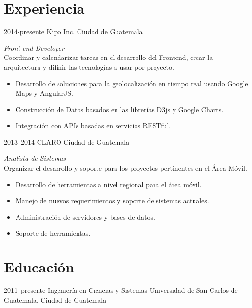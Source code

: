 \documentclass[]{friggeri-cv} %
\begin{document}
\section{Experiencia}
\begin{entrylist}
\entry
	{2014-presente}
	{Kipo Inc.}
	{Ciudad de Guatemala}
	{\emph{Front-end Developer} \\
	Coordinar y calendarizar tareas en el desarrollo del Frontend, crear la arquitectura y difinir las tecnologías a usar por proyecto.
	\begin{itemize}
		\item Desarrollo de soluciones para la geolocalización en tiempo real usando Google Maps y AngularJS.
		\item Construcción de Datos basados en las librerías D3js y Google Charts.
		\item Integración con APIs basadas en servicios RESTful.
	\end{itemize}
	
	}
	
\entry
	{2013--2014}
	{CLARO}
	{Ciudad de Guatemala}
	{\emph{Analista de Sistemas} \\
	Organizar el desarrollo y soporte para los proyectos pertinentes en el Área Móvil.
	\begin{itemize}
		\item Desarrollo de herramientas a nivel regional para el área móvil. 
		\item Manejo de nuevos requerimientos y soporte de sistemas actuales.
		\item Administración de servidores y bases de datos.
		\item Soporte de herramientas.
	\end{itemize}
	
	}

\end{entrylist}


\section{Educación}

\begin{entrylist}
\entry
{2011--presente}
{Ingeniería en Ciencias y Sistemas}
{Universidad de San Carlos de Guatemala, Ciudad de Guatemala	}
{}

\end{entrylist}
\end{document}
